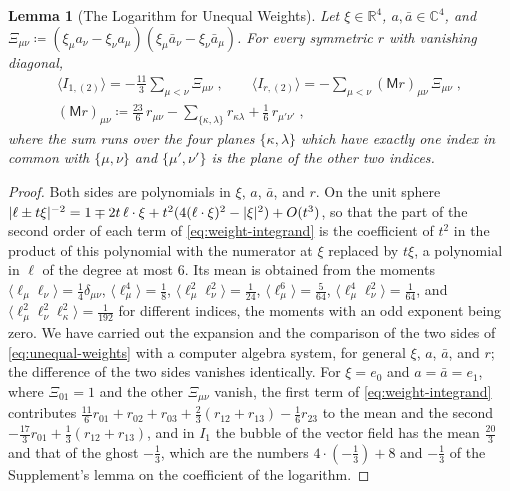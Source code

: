\documentclass[11pt]{preprint}
\DeclarePairedDelimiter{\abs}{\lvert}{\rvert}
\numberwithin{equation}{section}
\newtheorem{lemma}[theorem]{Lemma}
\theoremstyle{definition}
\theoremstyle{remark}
\theoremstyle{plain}
\begin{document}
\begin{lemma}[The Logarithm for Unequal Weights]\label{lem:unequal-weights}
Let $\xi \in \mathbb R^4$, $a, \bar a \in \mathbb C^4$, and $\Xi_{\mu\nu} \coloneqq (\xi_\mu a_\nu - \xi_\nu a_\mu)(\xi_\mu\bar a_\nu - \xi_\nu\bar a_\mu)$. For every symmetric $r$ with vanishing diagonal,
\begin{equation}\label{eq:unequal-weights}
\begin{gathered}
    \langle I_{1,(2)}\rangle = -\frac{11}{3}\sum_{\mu<\nu}\Xi_{\mu\nu}\;,
    \qquad
    \langle I_{r,(2)}\rangle = -\sum_{\mu<\nu}(\mathsf Mr)_{\mu\nu}\,\Xi_{\mu\nu}\;,\\
    (\mathsf Mr)_{\mu\nu} \coloneqq \frac{23}{6}\,r_{\mu\nu} - \sum_{\{ \kappa, \lambda \}}r_{\kappa\lambda} + \frac16\,r_{\mu'\nu'}\;,
\end{gathered}
\end{equation}
where the sum runs over the four planes $\{ \kappa, \lambda \}$ which have exactly one index in common with $\{ \mu, \nu \}$ and $\{ \mu', \nu' \}$ is the plane of the other two indices.
\end{lemma}

\begin{proof}
Both sides are polynomials in $\xi$, $a$, $\bar a$, and $r$. On the unit sphere $\abs{\ell \pm t\xi}^{-2} = 1 \mp 2t\,\ell \cdot \xi + t^2(4(\ell \cdot \xi)^2 - \abs\xi^2) + O(t^3)$, so that the part of the second order of each term of \eqref{eq:weight-integrand} is the coefficient of $t^2$ in the product of this polynomial with the numerator at $\xi$ replaced by $t\xi$, a polynomial in $\ell$ of the degree at most $6$. Its mean is obtained from the moments $\langle\ell_\mu\ell_\nu\rangle = \frac14\delta_{\mu\nu}$, $\langle\ell_\mu^4\rangle = \frac18$, $\langle\ell_\mu^2\ell_\nu^2\rangle = \frac1{24}$, $\langle\ell_\mu^6\rangle = \frac5{64}$, $\langle\ell_\mu^4\ell_\nu^2\rangle = \frac1{64}$, and $\langle\ell_\mu^2\ell_\nu^2\ell_\kappa^2\rangle = \frac1{192}$ for different indices, the moments with an odd exponent being zero. We have carried out the expansion and the comparison of the two sides of \eqref{eq:unequal-weights} with a computer algebra system, for general $\xi$, $a$, $\bar a$, and $r$; the difference of the two sides vanishes identically. For $\xi = e_0$ and $a = \bar a = e_1$, where $\Xi_{01} = 1$ and the other $\Xi_{\mu\nu}$ vanish, the first term of \eqref{eq:weight-integrand} contributes $\frac{11}{6}r_{01} + r_{02} + r_{03} + \frac23(r_{12} + r_{13}) - \frac16r_{23}$ to the mean and the second $-\frac{17}{3}r_{01} + \frac13(r_{12} + r_{13})$, and in $I_1$ the bubble of the vector field has the mean $\frac{20}{3}$ and that of the ghost $-\frac13$, which are the numbers $4 \cdot (-\frac13) + 8$ and $-\frac13$ of the Supplement's lemma on the coefficient of the logarithm.
\end{proof}
\end{document}
